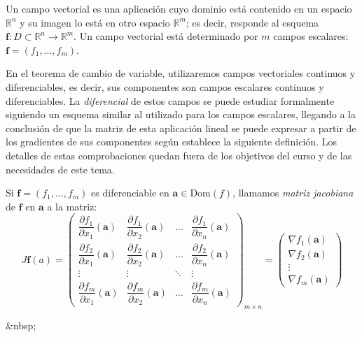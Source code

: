 \begin{definicion} Un campo vectorial es una aplicación cuyo dominio está contenido en un
espacio $\mathbb{R}^n$ y su imagen lo está en otro espacio $\mathbb{R}^m$; es decir, responde al esquema
$\boldsymbol{f}\colon \mathit D\subset\mathbb{R}^n\to \mathbb{R}^m$. Un campo vectorial está determinado por $m$ campos
escalares: $\boldsymbol{f}=(f_1,\dots ,f_m)$.
\end{definicion}

En el teorema de cambio de variable, utilizaremos campos vectoriales continuos y diferenciables, es decir, sus componentes son campos escalares continuos y diferenciables.
La \emph{diferencial} de estos campos se puede estudiar formalmente siguiendo un esquema similar al utilizado para los campos escalares, llegando a la conclusión de que la matriz de esta aplicación lineal se puede expresar a partir de los gradientes de sus componentes según establece la siguiente definición.
Los detalles de estas comprobaciones quedan fuera de los objetivos del curso y de las necesidades de este tema.
%
\begin{definicion}
Si $\boldsymbol{f}=(f_1,\dots,f_m)$ es diferenciable en $\boldsymbol{a}\in \mathrm{Dom}(f)$, llamamos \emph{matriz jacobiana} de $\boldsymbol{f}$ en $\boldsymbol{a}$ a la matriz:
\[
J\boldsymbol{f}(a)=\left(\begin{array}{cccc}
\dfrac{\partial f_1}{\partial x_1}(\boldsymbol{a}) &
\dfrac{\partial f_1}{\partial x_2}(\boldsymbol{a}) & \dots &
\dfrac{\partial f_1}{\partial x_n}(\boldsymbol{a})\\
\dfrac{\partial f_2}{\partial x_1}(\boldsymbol{a}) & 
\dfrac{\partial f_2}{\partial x_2}(\boldsymbol{a}) & \dots & 
\dfrac{\partial f_2}{\partial x_n}(\boldsymbol{a})\\
\vdots & \vdots & \ddots &\vdots \\
\dfrac{\partial f_m}{\partial x_1}(\boldsymbol{a}) & 
\dfrac{\partial f_m}{\partial x_2}(\boldsymbol{a}) & \dots & 
\dfrac{\partial f_m}{\partial x_n}(\boldsymbol{a})
\end{array}\right)_{m\times n}
=\left(\begin{array}{c}
\nabla f_1(\boldsymbol{a})\\
\nabla f_2(\boldsymbol{a})\\
\vdots \\
\nabla f_m(\boldsymbol{a})
\end{array}\right)
\]
\end{definicion}
\begin{rawhtml}
&nbsp;
\end{rawhtml}
